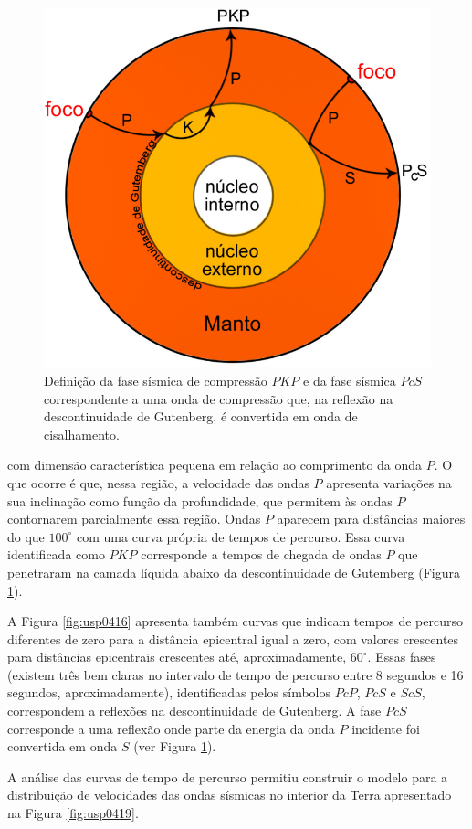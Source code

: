 \documentclass[]{book}
\theoremstyle{definition}
\theoremstyle{definition}
\theoremstyle{definition}
\theoremstyle{remark}
\begin{document}
\begin{figure}

{\centering \includegraphics[width=0.5\linewidth]{fig/figU18} 

}

\caption{Definição da fase sísmica de compressão $PKP$ e da fase sísmica $PcS$ correspondente a uma onda de compressão que, na reflexão na descontinuidade de Gutenberg, é convertida em onda de cisalhamento.}\label{fig:usp0418}
\end{figure}

com dimensão característica pequena em relação ao comprimento da onda \(P\). O que ocorre é que, nessa região, a velocidade das ondas \(P\) apresenta variações na sua inclinação como função da profundidade, que permitem às ondas \(P\) contornarem parcialmente essa região. Ondas \(P\) aparecem para distâncias maiores do que \(100^\circ\) com uma curva própria de tempos de percurso. Essa curva identificada como \(PKP\) corresponde a tempos de chegada de ondas \(P\) que penetraram na camada líquida abaixo da descontinuidade de Gutemberg (Figura \ref{fig:usp0418}).

A Figura \ref{fig:usp0416} apresenta também curvas que indicam tempos de percurso diferentes de zero para a distância epicentral igual a zero, com valores crescentes para distâncias epicentrais crescentes até, aproximadamente, \(60^\circ\). Essas fases (existem três bem claras no intervalo de tempo de percurso entre 8 segundos e 16 segundos, aproximadamente), identificadas pelos símbolos \(PcP\), \(PcS\) e \(ScS\), correspondem a reflexões na descontinuidade de Gutenberg. A fase \(PcS\) corresponde a uma reflexão onde parte da energia da onda \(P\) incidente foi convertida em onda \(S\) (ver Figura \ref{fig:usp0418}).

A análise das curvas de tempo de percurso permitiu construir o modelo para a distribuição de velocidades das ondas sísmicas no interior da Terra apresentado na Figura \ref{fig:usp0419}.
\end{document}
